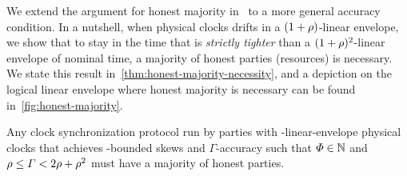 We extend the argument for honest majority in~\cite{JACM:SriTou87} to a more general accuracy condition.
%
In a nutshell, when physical clocks drifts in a $(1 + \rho)$-linear envelope, we show that to stay in the time that is \emph{strictly tighter} than a $(1 + \rho)^2$-linear envelope of nominal time, a majority of honest parties (resources) is necessary.
%
We state this result in~\cref{thm:honest-majority-necessity}, and a depiction on the logical linear envelope where honest majority is necessary can be found in~\cref{fig:honest-majority}.



\begin{theorem} \label{thm:honest-majority-necessity}
    Any clock synchronization protocol run by parties with \clockDrift-linear-envelope physical clocks that achieves \maxSkew-bounded skews and $\varGamma$-accuracy such that $\varPhi \in \mathbb{N}$ and $\rho \le \varGamma < 2\rho + \rho^2$ must have a majority of honest parties.
\end{theorem}

